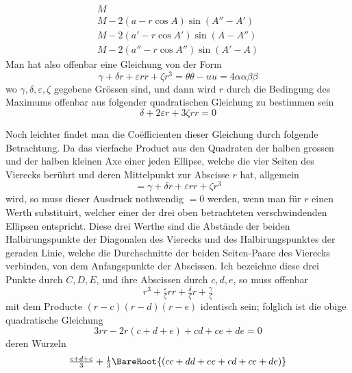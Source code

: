 %
\[
\begin{array}{l}
M\\
M-2(a-r\cos A)\sin(A''-A')\\
M-2(a'-r\cos A')\sin(A-A'')\\
M-2(a''-r\cos A'')\sin(A'-A)
\end{array}
\]
Man hat also offenbar eine Gleichung von der Form
\[
\gamma+\delta r+\varepsilon rr+\zeta r^3=\theta\theta-uu=4\alpha\alpha\beta\beta
\]
wo \(\gamma,\delta,\varepsilon,\zeta\) gegebene Grössen sind, und dann wird \(r\) durch die Bedingung des Maximums offenbar aus folgender quadratischen Gleichung zu bestimmen sein
\[
\delta+2\varepsilon r+3\zeta rr=0
\]
\par
Noch leichter findet man die Coëfficienten dieser Gleichung durch folgende Betrachtung. Da das vierfache Product aus den Quadraten der halben grossen und der halben kleinen Axe einer jeden Ellipse, welche die vier Seiten des Vierecks berührt und deren Mittelpunkt zur Abscisse \(r\) hat, allgemein
\[
=\gamma+\delta r+\varepsilon rr+\zeta r^3
\]
wird, so muss dieser Ausdruck nothwendig \(=0\) werden, wenn man für \(r\) einen Werth substituirt, welcher einer der drei oben betrachteten verschwindenden Ellipsen entspricht. Diese drei Werthe sind die Abstände der beiden Halbirungspunkte der Diagonalen des Vierecks und des Halbirungspunktes der geraden Linie, welche die Durchschnitte der beiden Seiten-Paare des Vierecks verbinden, von dem Anfangspunkte der Abscissen. Ich bezeichne diese drei Punkte durch \(C,D,E\), und ihre Abscissen durch \(c,d,e\), so muss offenbar
\[
r^3+\tfrac{\varepsilon}{\zeta}rr+\tfrac{\delta}{\zeta}r+\tfrac{\gamma}{\zeta}
\]
mit dem Producte \((r-c)(r-d)(r-e)\) identisch sein; folglich ist die obige quadratische Gleichung
\[
3rr-2r(c+d+e)+cd+ce+de=0
\]
deren Wurzeln
\[
\tfrac{c+d+e}{3}+\tfrac13\BareRoot{(cc+dd+ee+cd+ce+de)}
\]
